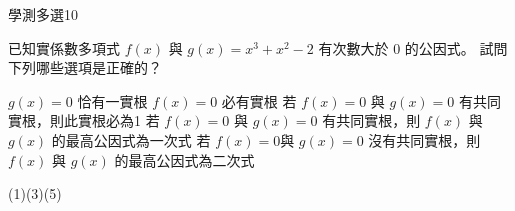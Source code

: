     \begin{QUESTION}
        \begin{ExamInfo}{97}{學測}{多選}{10}
        \end{ExamInfo}
        \begin{ExamAnsRateInfo}{26}{52}{16}{10}
        \end{ExamAnsRateInfo}
        \begin{QBODY}
            已知實係數多項式 $f(x)$ 與 $g(x) = x^3 + x^2 - 2$ 有次數大於 $0$ 的公因式。
			試問下列哪些選項是正確的？
			\begin{QOPS}
				\QOP $g(x)=0$ 恰有一實根 
				\QOP $f(x)=0$ 必有實根 
				\QOP 若 $f(x)=0$ 與 $g(x)=0$ 有共同實根，則此實根必為1 
				\QOP 若 $f(x)=0$ 與 $g(x)=0$ 有共同實根，則 $f(x)$ 與 $g(x)$ 的最高公因式為一次式 
				\QOP 若 $f(x)=0$與 $g(x)=0$ 沒有共同實根，則 $f(x)$ 與 $g(x)$ 的最高公因式為二次式
			\end{QOPS}
        \end{QBODY}
        \begin{QFROMS}
        \end{QFROMS}
        \begin{QTAGS}\end{QTAGS}
        \begin{QANS}
            (1)(3)(5)
        \end{QANS}
        \begin{QSOLLIST}
        \end{QSOLLIST}
        \begin{QEMPTYSPACE}
        \end{QEMPTYSPACE}
    \end{QUESTION}

